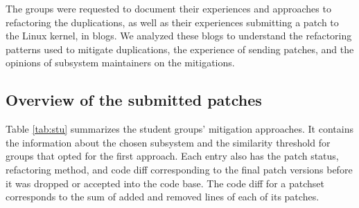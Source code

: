 \documentclass[12pt]{article}
\begin{document}
The groups were requested to document their experiences and approaches to refactoring the duplications, as well as their experiences submitting a patch to the Linux kernel, in blogs. We analyzed these blogs to understand the refactoring patterns used to mitigate duplications, the experience of sending patches, and the opinions of subsystem maintainers on the mitigations.

\subsection{Overview of the submitted patches}

Table \ref{tab:stu} summarizes the student groups' mitigation approaches. It contains the information about the chosen subsystem and the similarity threshold for groups that opted for the first approach. Each entry also has the patch status, refactoring method, and code diff corresponding to the final patch versions before it was dropped or accepted into the code base. The code diff for a patchset corresponds to the sum of added and removed lines of each of its patches.

\begin{table}[ht]
\centering
\caption{Refactor methods used and metrics of the students' mitigations.}
\label{tab:stu}
\end{table}
\end{document}
